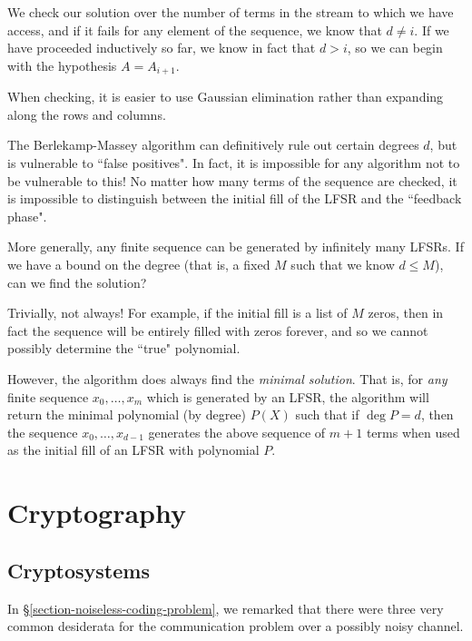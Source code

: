 \documentclass{article}
\begin{document}
We check our solution over the number of terms in the stream to which we have access, and if it fails for any element of the sequence, we know that $d \neq i$. If we have proceeded inductively so far, we know in fact that $d > i$, so we can begin with the hypothesis $A = A_{i+1}$.

\begin{note}
	When checking, it is easier to use Gaussian elimination rather than expanding along the rows and columns.
\end{note}

The Berlekamp-Massey algorithm can definitively rule out certain degrees $d$, but is vulnerable to ``false positives". In fact, it is impossible for any algorithm not to be vulnerable to this! No matter how many terms of the sequence are checked, it is impossible to distinguish between the initial fill of the LFSR and the ``feedback phase".

More generally, any finite sequence can be generated by infinitely many LFSRs. If we have a bound on the degree (that is, a fixed $M$ such that we know $d \leq M$), can we find the solution?

Trivially, not always! For example, if the initial fill is a list of $M$ zeros, then in fact the sequence will be entirely filled with zeros forever, and so we cannot possibly determine the ``true" polynomial.

However, the algorithm does always find the \textit{minimal solution}. That is, for \textit{any} finite sequence $x_0, \dots, x_m$ which is generated by an LFSR, the algorithm will return the minimal polynomial (by degree) $P(X)$ such that if $\deg P = d$, then the sequence $x_0, \dots, x_{d-1}$ generates the above sequence of $m+1$ terms when used as the initial fill of an LFSR with polynomial $P$.


\pagebreak
\section{Cryptography}
\subsection{Cryptosystems}
\label{section-cryptography-systems}

In \S\ref{section-noiseless-coding-problem}, we remarked that there were three very common desiderata for the communication problem over a possibly noisy channel.
\end{document}
